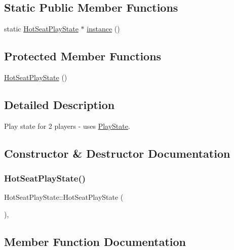 \subsection*{Static Public Member Functions}
\begin{DoxyCompactItemize}
\item 
static \mbox{\hyperlink{class_hot_seat_play_state}{Hot\+Seat\+Play\+State}} $\ast$ \mbox{\hyperlink{class_hot_seat_play_state_a2a0510cffde2533a6b8c9e02fa299302}{instance}} ()
\end{DoxyCompactItemize}
\subsection*{Protected Member Functions}
\begin{DoxyCompactItemize}
\item 
\mbox{\hyperlink{class_hot_seat_play_state_a634bf50c77bcff048ac47ec11d7e1ea4}{Hot\+Seat\+Play\+State}} ()
\end{DoxyCompactItemize}


\subsection{Detailed Description}
Play state for 2 players -\/ uses \mbox{\hyperlink{class_play_state}{Play\+State}}. 

\subsection{Constructor \& Destructor Documentation}
\mbox{\label{class_hot_seat_play_state_a634bf50c77bcff048ac47ec11d7e1ea4}} 
\subsubsection{\texorpdfstring{HotSeatPlayState()}{HotSeatPlayState()}}
{\footnotesize\ttfamily Hot\+Seat\+Play\+State\+::\+Hot\+Seat\+Play\+State (\begin{DoxyParamCaption}{ }\end{DoxyParamCaption})\hspace{0.3cm}{\ttfamily [inline]}, {\ttfamily [protected]}}



\subsection{Member Function Documentation}
\mbox{\label{class_hot_seat_play_state_ae9ca450fc070526a0ee329002e4308f2}} 
